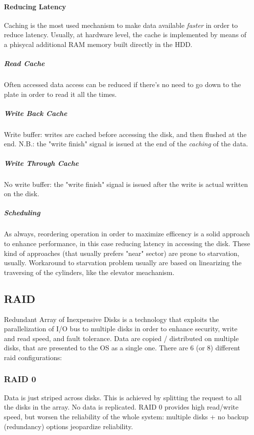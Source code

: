 \documentclass[10pt,a4paper]{article}
\begin{document}
					\paragraph{Reducing Latency}
						Caching is the most used mechanism to make data available \emph{faster} in order to reduce latency. Usually, at hardware level, the cache is implemented by means of a phisycal additional RAM memory built directly in the HDD.
						
						\subparagraph{Read Cache}
							Often accessed data access can be reduced if there's no need to go down to the plate in order to read it all the times.
						
						\subparagraph{Write Back Cache}
							Write buffer: writes are cached before accessing the disk, and then flushed at the end. N.B.: the "write finish" signal is issued at the end of the \emph{caching} of the data.
							
						\subparagraph{Write Through Cache}
							No write buffer: the "write finish" signal is issued after the write is actual written on the disk.
							
						\subparagraph{Scheduling}
							As always, reordering operation in order to maximize efficency is a solid approach to enhance performance, in this case reducing latency in accessing the disk. These kind of approaches (that usually prefers "near" sector) are prone to starvation, usually. Workaround to starvation problem usually are based on linearizing the traversing of the cylinders, like the elevator meachanism.\\
			
			\subsection{RAID}
				Redundant Array of Inexpensive Disks is a technology that exploits the parallelization of I/O bus to multiple disks in order to enhance security, write and read speed, and fault tolerance. Data are copied / distributed on multiple disks, that are presented to the OS as a single one. There are 6 (or 8) different raid configurations:
				
				\subsubsection{RAID 0}
					Data is just striped across disks. This is achieved by splitting the request to all the disks in the array. No data is replicated. RAID 0 provides high read/write speed, but worsen the reliability of the whole system: multiple disks + no backup (redundancy) options jeopardize reliability.
					
\end{document}
